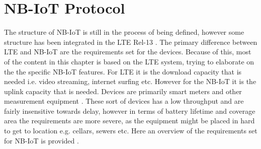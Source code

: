 \chapter{NB-IoT Protocol}\label{ch:NB-IoT}

The structure of \gls{NB-IoT} is still in the process of being defined, however some structure has been integrated in the \gls{LTE} Rel-13 \citep{REL-13}. The primary difference between \gls{LTE} and \gls{NB-IoT} are the requirements set for the devices. Because of this, most of the content in this chapter is based on the \gls{LTE} system, trying to elaborate on the the specific \gls{NB-IoT} features. For \gls{LTE} it is the download capacity that is needed i.e. video streaming, internet surfing etc. However for the \gls{NB-IoT} it is the uplink capacity that is needed. Devices are primarily smart meters and other measurement equipment \citep{primer}. These sort of devices has a low throughput and are fairly insensitive towards delay, however in terms of battery lifetime and coverage area the requirements are more severe, as the equipment might be placed in hard to get to location e.g. cellars, sewers etc. Here an overview of the requirements set for \gls{NB-IoT} is provided \citep{NB-IoT_Book}.

